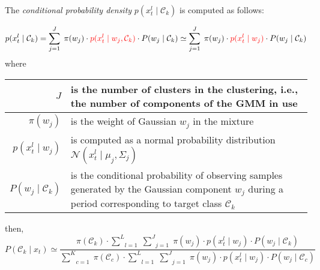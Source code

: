 \documentclass[a4paper,12pt]{article}
\begin{document}
\medskip

The \emph{conditional probability density} $p(x_{t}^{l} \mid \mathcal{C}_{k})$ is computed as follows:

\[
p(x_{t}^{l} \mid \mathcal{C}_{k}) = \sum_{j=1}^J \; \pi(w_j) \cdot {\color{red} p(x_{t}^{l} \mid w_j, \mathcal{C}_{k})} \cdot P(w_j \mid \mathcal{C}_{k})
\simeq \sum_{j=1}^J \; \pi(w_j) \cdot {\color{red}p(x_{t}^{l} \mid w_j)} \cdot P(w_j \mid \mathcal{C}_{k})
\]
where
\begin{center}
\begin{tabular}{|r|p{130mm}|}
\hline
$J$ & is the number of clusters in the clustering, i.e., the number of components of the GMM in use \\
\hline
$\pi(w_j)$ & is the weight of Gaussian $w_j$ in the mixture \\
\hline
$p(x_{t}^{l} \mid w_j)$ & is computed as a normal probability distribution $\mathcal{N}(x_{t}^{l} \mid \mu_{j}, \Sigma_{j})$ \\
\hline
$P(w_j \mid \mathcal{C}_{k})$ & is the conditional probability of observing samples generated by the
                              Gaussian component $w_j$ during a period corresponding
                              to target class $\mathcal{C}_{k}$ \\
\hline
\end{tabular}
\end{center}
then, 
\[
P(\mathcal{C}_{k} \mid x_{t}) \simeq
    \frac{\pi(\mathcal{C}_{k}) \cdot \underset{l=1}{\overset{L}{\sum}} \; \underset{j=1}{\overset{J}{\sum}} \; \pi(w_{j}) \cdot p(x_{t}^{l} \mid w_{j}) \cdot P(w_{j} \mid \mathcal{C}_{k})}%
           {\underset{c=1}{\overset{K}{\sum}} \; \pi(\mathcal{C}_{c}) \cdot \underset{l=1}{\overset{L}{\sum}} \; \underset{j=1}{\overset{J}{\sum}} \; \pi(w_{j}) \cdot p(x_{t}^{l} \mid w_{j}) \cdot P(w_{j} \mid \mathcal{C}_{c})}
\]
\end{document}
